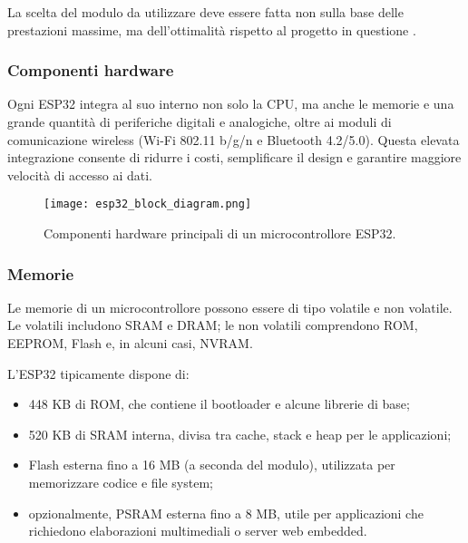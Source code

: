 La scelta del modulo da utilizzare deve essere fatta non sulla base delle prestazioni massime, ma dell’ottimalità rispetto al
 progetto in questione \citep{Patti2024}.

\subsubsection{Componenti hardware}
Ogni ESP32 integra al suo interno non solo la CPU, ma anche le memorie e una grande quantità di periferiche digitali e analogiche, 
oltre ai moduli di comunicazione wireless (Wi-Fi 802.11 b/g/n e Bluetooth 4.2/5.0).  
Questa elevata integrazione consente di ridurre i costi, semplificare il design e garantire maggiore velocità di accesso ai dati.

\begin{figure}[H]
\centering
\texttt{[image: esp32\_block\_diagram.png]}
\caption{Componenti hardware principali di un microcontrollore ESP32.}
\label{fig:esp32-mcu}
\end{figure}

\subsubsection{Memorie}
Le memorie di un microcontrollore possono essere di tipo volatile e non volatile. Le volatili includono SRAM e DRAM; le non volatili comprendono ROM, EEPROM, 
Flash e, in alcuni casi, NVRAM.

L’ESP32 tipicamente dispone di:
\begin{itemize}
    \item 448 KB di ROM, che contiene il bootloader e alcune librerie di base;
    \item 520 KB di SRAM interna, divisa tra cache, stack e heap per le applicazioni;
    \item Flash esterna fino a 16 MB (a seconda del modulo), utilizzata per memorizzare codice e file system;
    \item opzionalmente, PSRAM esterna fino a 8 MB, utile per applicazioni che richiedono elaborazioni multimediali o server web embedded.
\end{itemize}




